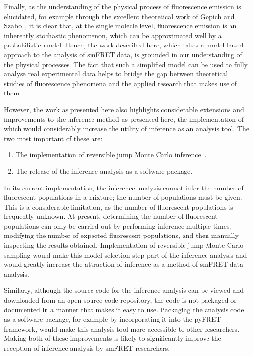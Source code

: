 Finally, as the understanding of the physical process of fluorescence emission is elucidated, for example through the excellent theoretical work of Gopich and Szabo~\cite{gopich07, gopich09, gopich12}, it is clear that, at the single molecle level, fluorescence emission is an inherently stochastic phenomenon, which can be approximated well by a probabilistic model. Hence, the work described here, which takes a model-based approach to the analysis of smFRET data, is grounded in our understanding of the physical processes. The fact that such a simplified model can be used to fully analyse real experimental data helps to bridge the gap between theoretical studies of fluorescence phenomena and the applied research that makes use of them.


However, the work as presented here also highlights considerable extensions and improvements to the inference method as presented here, the implementation of which would considerably increase the utility of inference as an analysis tool. The two most important of these are:

\begin{enumerate}
\item The implementation of reversible jump Monte Carlo inference~\cite{green1995}.
\item The release of the inference analysis as a software package.
\end{enumerate}

In its current implementation, the inference analysis cannot infer the number of fluorescent populations in a mixture; the number of populations must be given. This is a considerable limitation, as the number of fluorescent populations is frequently unknown. At present, determining the number of fluorescent populations can only be carried out by performing inference multiple times, modifying the number of expected fluorescent populations, and then manually inspecting the results obtained. Implementation of reversible jump Monte Carlo sampling would make this model selection step part of the inference analysis and would greatly increase the attraction of inference as a method of smFRET data analysis. 

Similarly, although the source code for the inference analysis can be viewed and downloaded from an open source code repository, the code is not packaged or documented in a manner that makes it easy to use. Packaging the analysis code as a software package, for example by incorporating it into the pyFRET framework, would make this analysis tool more accessible to other researchers. Making both of these improvements is likely to significantly improve the reception of inference analysis by smFRET researchers.

